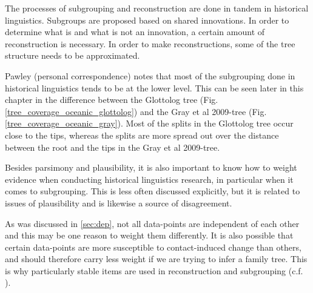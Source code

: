 \documentclass[draft,10pt]{article} %
\begin{document}

The processes of subgrouping and reconstruction are done in tandem in historical linguistics. Subgroups are proposed based on shared innovations. In order to determine what is and what is not an innovation, a certain amount of reconstruction is necessary. In order to make reconstructions, some of the tree structure needs to be approximated. 

Pawley (personal correspondence) notes that most of the subgrouping done in historical linguistics tends to be at the lower level. This can be seen later in this chapter in the difference between the Glottolog tree (Fig. \ref{tree_coverage_oceanic_glottolog}) and the Gray et al 2009-tree (Fig. \ref{tree_coverage_oceanic_gray}). Most of the splits in the Glottolog tree occur close to the tips, whereas the splits are more spread out over the distance between the root and the tips in the Gray et al 2009-tree.

Besides parsimony and plausibility, it is also important to know how to weight evidence when conducting historical linguistics research, in particular when it comes to subgrouping. This is less often discussed explicitly, but it is related to issues of plausibility and is likewise a source of disagreement. 

As was discussed in \ref{sec:dep}, not all data-points are independent of each other and this may be one reason to weight them differently. It is also possible that certain data-points are more susceptible to contact-induced change than others, and should therefore carry less weight if we are trying to infer a family tree. This is why particularly stable items are used in reconstruction and subgrouping (c.f. \citet{pawley_2009_solomons}).
\end{document}
